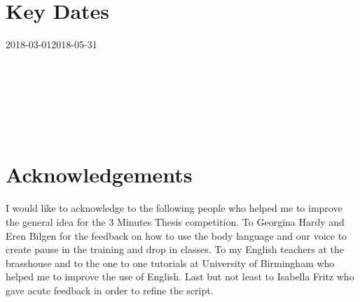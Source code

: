 \documentclass[12pt]{article}
\begin{document}
\newpage



\section*{Key Dates} 

\begin{ganttchart}[
	hgrid,
	vgrid,
	x unit=1mm,
	time slot format=isodate-yearmonth
	]{2018-03-01}{2018-05-31}
 \\
 \\
 \\
 \\

 \\
 \\
 \\
\end{ganttchart}



\section*{Acknowledgements}

I would like to acknowledge to the following people
who helped me to improve the general idea for the 3 Minutes Thesis competition.
To Georgina Hardy and Eren Bilgen for the feedback on how to use 
the body language and our voice to create pause in the training and drop in classes. 
To my English teachers at the brasshouse and to 
the one to one tutorials at University of Birmingham who helped me to 
improve the use of English. 
Last but not least to Isabella Fritz who gave acute feedback 
in order to refine the script.

\end{document}
